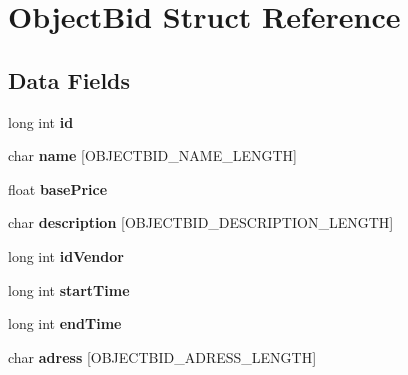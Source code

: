 \hypertarget{struct_object_bid}{\section{Object\-Bid Struct Reference}
\label{struct_object_bid}
}
\subsection*{Data Fields}
\begin{DoxyCompactItemize}
\item 
\hypertarget{struct_object_bid_a53f4656a3ccbae3d40e94f582eef745f}{long int {\bfseries id}}\label{struct_object_bid_a53f4656a3ccbae3d40e94f582eef745f}

\item 
\hypertarget{struct_object_bid_a8b0efa1f52a6b46d640cfcf93172083e}{char {\bfseries name} \mbox{[}O\-B\-J\-E\-C\-T\-B\-I\-D\-\_\-\-N\-A\-M\-E\-\_\-\-L\-E\-N\-G\-T\-H\mbox{]}}\label{struct_object_bid_a8b0efa1f52a6b46d640cfcf93172083e}

\item 
\hypertarget{struct_object_bid_ad7e7bdb2bbc09612e2b037a0df5d76dd}{float {\bfseries base\-Price}}\label{struct_object_bid_ad7e7bdb2bbc09612e2b037a0df5d76dd}

\item 
\hypertarget{struct_object_bid_a203af9554762f924c14e5c30b24352a1}{char {\bfseries description} \mbox{[}O\-B\-J\-E\-C\-T\-B\-I\-D\-\_\-\-D\-E\-S\-C\-R\-I\-P\-T\-I\-O\-N\-\_\-\-L\-E\-N\-G\-T\-H\mbox{]}}\label{struct_object_bid_a203af9554762f924c14e5c30b24352a1}

\item 
\hypertarget{struct_object_bid_a56c855fe82a6ab9e09389c23a73eeec0}{long int {\bfseries id\-Vendor}}\label{struct_object_bid_a56c855fe82a6ab9e09389c23a73eeec0}

\item 
\hypertarget{struct_object_bid_a39256f6302441e1a26db958909e7431d}{long int {\bfseries start\-Time}}\label{struct_object_bid_a39256f6302441e1a26db958909e7431d}

\item 
\hypertarget{struct_object_bid_a03ea3a2cebde4b5cae63c7105339c294}{long int {\bfseries end\-Time}}\label{struct_object_bid_a03ea3a2cebde4b5cae63c7105339c294}

\item 
\hypertarget{struct_object_bid_a05eb87542785d73c5aa5cbe4e3a6d262}{char {\bfseries adress} \mbox{[}O\-B\-J\-E\-C\-T\-B\-I\-D\-\_\-\-A\-D\-R\-E\-S\-S\-\_\-\-L\-E\-N\-G\-T\-H\mbox{]}}\label{struct_object_bid_a05eb87542785d73c5aa5cbe4e3a6d262}


\end{DoxyCompactItemize}
